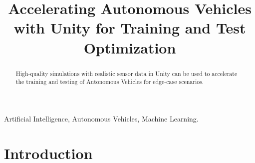 \documentclass[conference]{IEEEtran}
\begin{document}
\title{Accelerating Autonomous Vehicles with Unity for Training and Test Optimization}


\author{
\and
{}
\and
{}
\and
{}
}
\maketitle

\begin{abstract}
High-quality simulations with realistic sensor data in Unity can be used to accelerate the training and testing of Autonomous Vehicles for edge-case scenarios.
\end{abstract}

\begin{IEEEkeywords}
Artificial Intelligence, Autonomous Vehicles, Machine Learning.
\end{IEEEkeywords}

\section{Introduction}
\end{document}
